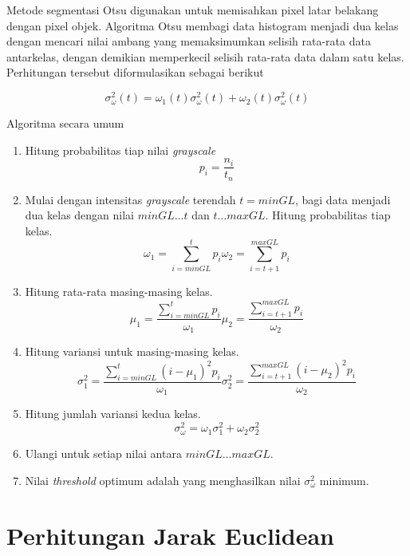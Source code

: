 \documentclass[laporan.tex]{subfiles}
\begin{document}
Metode segmentasi Otsu digunakan untuk memisahkan pixel latar belakang dengan pixel objek. Algoritma Otsu membagi data histogram menjadi dua kelas dengan mencari nilai ambang yang memaksimumkan selisih rata-rata data antarkelas, dengan demikian memperkecil selisih rata-rata data dalam satu kelas. Perhitungan tersebut diformulasikan sebagai berikut

\begin{equation}
	\sigma_{\omega}^2 (t) = \omega_1 (t) \sigma_{\omega}^2 (t) + \omega_2 (t) \sigma_{\omega}^2 (t)
\end{equation}

Algoritma secara umum
\begin{enumerate}
\item Hitung probabilitas tiap nilai \emph{grayscale}
\begin{equation}
	p_i = \frac{n_i}{t_n}
\end{equation}
\item Mulai dengan intensitas \emph{grayscale} terendah $t=minGL$, bagi data menjadi dua kelas dengan nilai $minGL \ldots t$ dan $t \ldots maxGL$. Hitung probabilitas tiap kelas.
\begin{equation}
	\omega_1 = \sum_{i=minGL}^t p_i
	\omega_2 = \sum_{i=t+1}^{maxGL} p_i
\end{equation}
\item Hitung rata-rata masing-masing kelas.
\begin{equation}
	\mu_1 = \frac{\sum_{i=minGL}^t p_i}{\omega_1}
	\mu_2 = \frac{\sum_{i=t+1}^{maxGL} p_i}{\omega_2}
\end{equation}
\item Hitung variansi untuk masing-masing kelas.
\begin{equation}
	\sigma_1^2 = \frac{\sum_{i=minGL}^t (i - \mu_1)^2 p_i}{\omega_1}
	\sigma_2^2 = \frac{\sum_{i=t+1}^{maxGL} (i - \mu_2)^2 p_i}{\omega_2}
\end{equation}
\item Hitung jumlah variansi kedua kelas.
\begin{equation}
	\sigma_{\omega}^2 = \omega_1 \sigma_1^2 + \omega_2 \sigma_2^2
\end{equation}
\item Ulangi untuk setiap nilai antara $minGL \ldots maxGL$.
\item Nilai \emph{threshold} optimum adalah yang menghasilkan nilai $\sigma_{\omega}^2$ minimum.
\end{enumerate}

\section{Perhitungan Jarak Euclidean}
\end{document}
